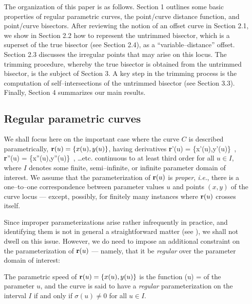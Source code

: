 The organization of this paper is as follows. Section 1 outlines
some basic properties of regular parametric curves, the point/curve
distance function, and point/curve bisectors. After reviewing the
notion of an offset curve in Section 2.1, we show in Section 2.2
how to represent the untrimmed bisector, which is a superset of
the true bisector (see Section 2.4), as a ``variable--distance''
offset. Section 2.3 discusses the irregular points that may arise
on this locus. The trimming procedure, whereby the true bisector
is obtained from the untrimmed bisector, is the subject of Section
3. A key step in the trimming process is the computation of
self--intersections of the untrimmed bisector (see Section 3.3).
Finally, Section 4 summarizes our main results.

\subsection{Regular parametric curves}

We shall focus here on the important case where the curve $C$
is described parametrically, ${\bf r}(u)=\{x(u),y(u)\}$, having
derivatives
\be \label{derivs}
{\bf r}'(u) = \{x'(u),y'(u)\} \,, \quad
{\bf r}''(u) = \{x''(u),y''(u)\} \,, \quad
\ldots {\rm etc.}
\ee
continuous to at least third order for all $u \in I$, where $I$
denotes some finite, semi--infinite, or infinite parameter domain
of interest. We assume that the parameterization of ${\bf r}(u)$
is {\it proper}, {\it i.e.}, there is a one--to--one correspondence
between parameter values $u$ and points $(x,y)$ of the curve
locus --- except, possibly, for finitely many instances where
${\bf r}(u)$ crosses itself.

Since improper parameterizations arise rather infrequently in
practice, and identifying them is not in general a straightforward
matter (see \cite{sederberg84,sederberg86}), we shall not dwell on
this issue. However, we do need to impose an additional constraint
on the parameterization of ${\bf r}(u)$ --- namely, that it be
{\it regular\/} over the parameter domain of interest:

\begin{dfn}
The parametric speed of ${\bf r}(u)=\{x(u),y(u)\}$ is the
function
\be \label{sigma}
\sigma(u) = 
\ee
of the parameter $u$, and the curve is said to have a {\it
regular\/} parameterization on the interval $I$ if and only if
$\sigma(u)\not=0$ for all $u \in I$.
\end{dfn}

